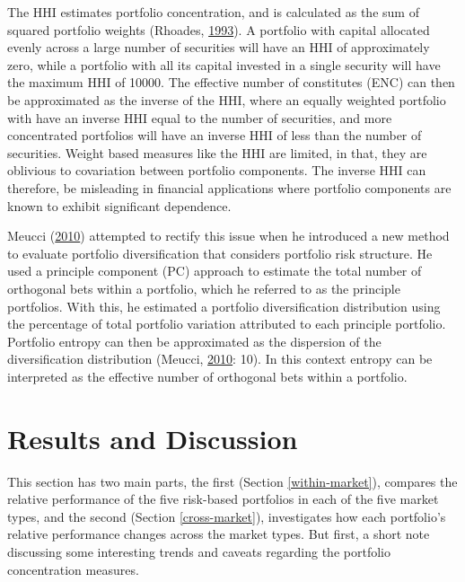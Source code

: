 \documentclass[11pt,preprint, authoryear]{elsarticle}
\numberwithin{equation}{section}
\numberwithin{figure}{section}
\numberwithin{table}{section}
\begin{document}
The HHI estimates portfolio concentration, and is calculated as the sum
of squared portfolio weights (Rhoades,
\protect\hyperlink{ref-rhoades1993}{1993}). A portfolio with capital
allocated evenly across a large number of securities will have an HHI of
approximately zero, while a portfolio with all its capital invested in a
single security will have the maximum HHI of 10000. The effective number
of constitutes (ENC) can then be approximated as the inverse of the HHI,
where an equally weighted portfolio with have an inverse HHI equal to
the number of securities, and more concentrated portfolios will have an
inverse HHI of less than the number of securities. Weight based measures
like the HHI are limited, in that, they are oblivious to covariation
between portfolio components. The inverse HHI can therefore, be
misleading in financial applications where portfolio components are
known to exhibit significant dependence.

Meucci (\protect\hyperlink{ref-meucci2010}{2010}) attempted to rectify
this issue when he introduced a new method to evaluate portfolio
diversification that considers portfolio risk structure. He used a
principle component (PC) approach to estimate the total number of
orthogonal bets within a portfolio, which he referred to as the
principle portfolios. With this, he estimated a portfolio
diversification distribution using the percentage of total portfolio
variation attributed to each principle portfolio. Portfolio entropy can
then be approximated as the dispersion of the diversification
distribution (Meucci, \protect\hyperlink{ref-meucci2010}{2010}: 10). In
this context entropy can be interpreted as the effective number of
orthogonal bets within a portfolio.

\hypertarget{results-and-discussion}{%
\section{\texorpdfstring{Results and Discussion
\label{reasults}}{Results and Discussion }}\label{results-and-discussion}}

This section has two main parts, the first (Section
\ref{within-market}), compares the relative performance of the five
risk-based portfolios in each of the five market types, and the second
(Section \ref{cross-market}), investigates how each portfolio's relative
performance changes across the market types. But first, a short note
discussing some interesting trends and caveats regarding the portfolio
concentration measures.
\end{document}

